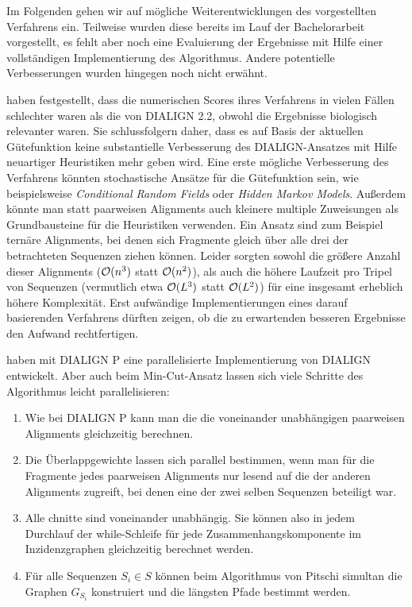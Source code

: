 Im Folgenden gehen wir auf mögliche Weiterentwicklungen des vorgestellten Verfahrens ein. Teilweise wurden diese bereits im Lauf der Bachelorarbeit vorgestellt, es fehlt aber noch eine Evaluierung der Ergebnisse mit Hilfe einer vollständigen Implementierung des Algorithmus. Andere potentielle Verbesserungen wurden hingegen noch nicht erwähnt.

\cite{cpm10} haben festgestellt, dass die numerischen Scores ihres Verfahrens in vielen Fällen schlechter waren als die von DIALIGN 2.2, obwohl die Ergebnisse biologisch relevanter waren. Sie schlussfolgern daher, dass es auf Basis der aktuellen Gütefunktion keine substantielle Verbesserung des DIALIGN-Ansatzes mit Hilfe neuartiger Heuristiken mehr geben wird. Eine erste mögliche Verbesserung des Verfahrens könnten stochastische Ansätze für die Gütefunktion sein, wie beispielsweise \emph{Conditional Random Fields} oder \emph{Hidden Markov Models}\cite{sm10,e95}. Außerdem könnte man statt paarweisen Alignments auch kleinere multiple Zuweisungen als Grundbausteine für die Heuristiken verwenden. Ein Ansatz sind zum Beispiel ternäre Alignments, bei denen sich Fragmente gleich über alle drei der betrachteten Sequenzen ziehen können. Leider sorgten sowohl die größere Anzahl dieser Alignments ($\mathcal{O}(n^3)$ statt $\mathcal{O}(n^2)$), als auch die höhere Laufzeit pro Tripel von Sequenzen (vermutlich etwa $\mathcal{O}(L^3)$ statt $\mathcal{O}(L^2)$) für eine insgesamt erheblich höhere Komplexität. Erst aufwändige Implementierungen eines darauf basierenden Verfahrens dürften zeigen, ob die zu erwartenden besseren Ergebnisse den Aufwand rechtfertigen.

\cite{snkm04} haben mit DIALIGN P eine parallelisierte Implementierung von DIALIGN entwickelt. Aber auch beim Min-Cut-Ansatz lassen sich viele Schritte des Algorithmus leicht parallelisieren:

\begin{enumerate}[topsep=0pt,itemsep=-1ex,partopsep=1ex,parsep=1ex]
	\item Wie bei DIALIGN P kann man die die voneinander unabhängigen paarweisen Alignments gleichzeitig berechnen.
	\item Die Überlappgewichte lassen sich parallel bestimmen, wenn man für die Fragmente jedes paarweisen Alignments nur lesend auf die der anderen Alignments zugreift, bei denen eine der zwei selben Sequenzen beteiligt war.
	\item Alle chnitte sind voneinander unabhängig. Sie können also in jedem Durchlauf der while-Schleife für jede Zusammenhangskomponente im Inzidenzgraphen gleichzeitig berechnet werden.
	\item Für alle Sequenzen $S_i \in S$ können beim Algorithmus von Pitschi simultan die Graphen $G_{S_i}$ konstruiert und die längsten Pfade bestimmt werden.
\end{enumerate}

